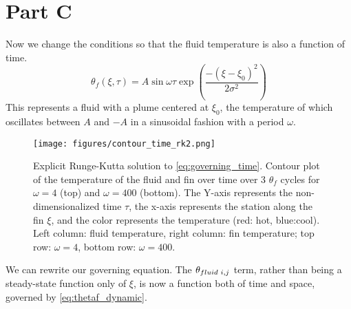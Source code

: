 \documentclass[10pt,letterpaper,notitlepage]{article}
\begin{document}
    \section{Part C}
    Now we change the conditions so that the fluid temperature is also a function of time.
    \begin{equation}
        \theta_f(\xi, \tau) = A \sin{\omega \tau} \exp{\left(\frac{-(\xi-\xi_0)^2}{2 \sigma ^2}\right)}
        \label{eq:thetaf_dynamic}
    \end{equation}
    This represents a fluid with a plume centered at $\xi_0$, the temperature of which oscillates between $A$ and $-A$ in a sinusoidal fashion with a period $\omega$.
    \begin{figure}
        \centering
        \texttt{[image: figures/contour\_time\_rk2.png]}
        \caption[Explicit solution for time-dependent fin temperature]{Explicit Runge-Kutta solution to \cref{eq:governing_time}. Contour plot of the temperature of the fluid and fin over time over 3 $\theta_f$ cycles for $\omega=4$ (top) and $\omega=400$ (bottom). The Y-axis represents the non-dimensionalized time $\tau$, the x-axis represents the station along the fin $\xi$, and the color represents the temperature (red: hot, blue:cool). Left column: fluid temperature, right column: fin temperature; top row: $\omega=4$, bottom row: $\omega=400$. }
        \label{fig:contour_time_rk2}
    \end{figure}
    We can rewrite our governing equation. The $\theta_{fluid \hspace{0.1cm} i,j}$ term, rather than being a steady-state function only of $\xi$, is now a function both of time and space, governed by \cref{eq:thetaf_dynamic}.
\end{document}
